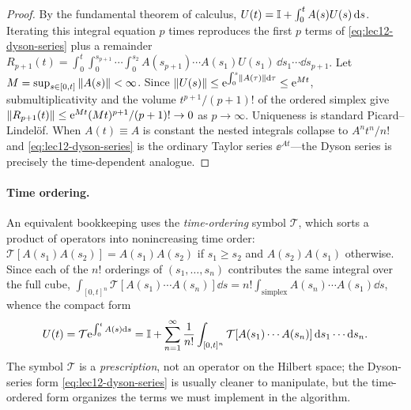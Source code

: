 \begin{proof}
By the fundamental theorem of calculus, $U(t)=\mathbb{I}+\int_0^t A(s)U(s)\,\mathrm{d} s$. Iterating this
integral equation $p$ times reproduces the first $p$ terms of \eqref{eq:lec12-dyson-series}
plus a remainder
$R_{p+1}(t)=\int_0^t\!\int_0^{s_{p+1}}\!\cdots\int_0^{s_2}A(s_{p+1})\cdots A(s_1)U(s_1)\,
\dd s_1\cdots\dd s_{p+1}$. Let $M=\sup_{s\in[0,t]}\left\lVert A(s) \right\rVert<\infty$. Since
$\left\lVert U(s) \right\rVert\le\mathrm{e}^{\int_0^s\left\lVert A(\tau) \right\rVert\mathrm{d}\tau}\le\mathrm{e}^{Mt}$, submultiplicativity and the
volume $t^{p+1}/(p+1)!$ of the ordered simplex give
$\left\lVert R_{p+1}(t) \right\rVert\le\mathrm{e}^{Mt}(Mt)^{p+1}/(p+1)!\to0$ as $p\to\infty$. Uniqueness is standard
Picard--Lindel\"of. When $A(t)\equiv A$ is constant the nested integrals collapse to
$A^n t^n/n!$ and \eqref{eq:lec12-dyson-series} is the ordinary Taylor series
$\ee^{At}$---the Dyson series is precisely the time-dependent analogue.
\end{proof}

\paragraph{Time ordering.}
An equivalent bookkeeping uses the \emph{time-ordering} symbol $\mathcal T$, which sorts a
product of operators into nonincreasing time order:
$\mathcal T[A(s_1)A(s_2)]=A(s_1)A(s_2)$ if $s_1\ge s_2$ and $A(s_2)A(s_1)$ otherwise. Since
each of the $n!$ orderings of $(s_1,\dots,s_n)$ contributes the same integral over the full
cube, $\int_{[0,t]^n}\mathcal T[A(s_1)\cdots A(s_n)]\dd s=n!\int_{\mathrm{simplex}}
A(s_n)\cdots A(s_1)\dd s$, whence the compact form
\begin{equation}
  U(t)=\mathcal T\mathrm{e}^{\int_0^tA(s)\mathrm{d} s}
   =\mathbb{I}+\sum_{n=1}^{\infty}\frac{1}{n!}\int_{[0,t]^n}
     \mathcal T[A(s_1)\cdots A(s_n)]\,\mathrm{d} s_1\cdots\mathrm{d} s_n.
  \label{eq:lec12-timeorder}
\end{equation}
The symbol $\mathcal T$ is a \emph{prescription}, not an operator on the Hilbert space; the
Dyson-series form \eqref{eq:lec12-dyson-series} is usually cleaner to manipulate, but the
time-ordered form organizes the terms we must implement in the algorithm.

